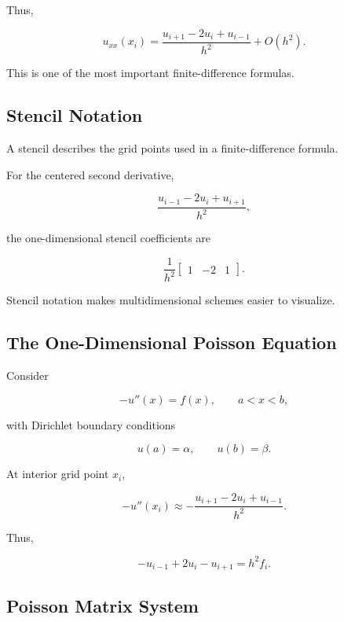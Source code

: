 Thus,

\[
\boxed{
u_{xx}(x_i)
=
\frac{
u_{i+1}-2u_i+u_{i-1}
}{
h^2
}
+
O(h^2).
}
\]

This is one of the most important finite-difference formulas.

\subsection{Stencil Notation}
\label{subsec:pde-stencils}

A stencil describes the grid points used in a finite-difference formula.

For the centered second derivative,

\[
\boxed{
\frac{
u_{i-1}-2u_i+u_{i+1}
}{
h^2
},
}
\]

the one-dimensional stencil coefficients are

\[
\boxed{
\frac1{h^2}
\begin{bmatrix}
1 & -2 & 1
\end{bmatrix}.
}
\]

Stencil notation makes multidimensional schemes easier to visualize.

\subsection{The One-Dimensional Poisson Equation}
\label{subsec:one-dimensional-poisson}

Consider

\[
\boxed{
-u''(x)=f(x),
\qquad
a<x<b,
}
\]

with Dirichlet boundary conditions

\[
\boxed{
u(a)=\alpha,
\qquad
u(b)=\beta.
}
\]

At interior grid point \(x_i\),

\[
-u''(x_i)
\approx
-
\frac{
u_{i+1}-2u_i+u_{i-1}
}{
h^2
}.
\]

Thus,

\[
\boxed{
-u_{i-1}
+
2u_i
-
u_{i+1}
=
h^2f_i.
}
\]

\subsection{Poisson Matrix System}
\label{subsec:poisson-matrix-system}

